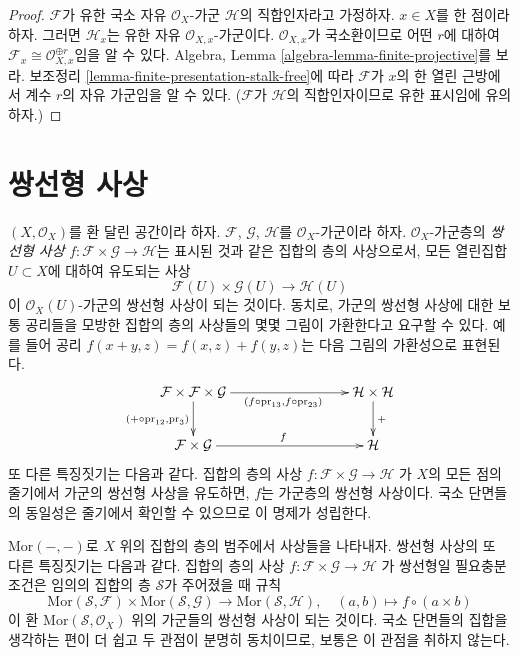 \begin{proof}
$\mathcal{F}$가 유한 국소 자유 $\mathcal{O}_X$-가군 $\mathcal{H}$의
직합인자라고 가정하자. $x \in X$를 한 점이라 하자. 그러면
$\mathcal{H}_x$는 유한 자유 $\mathcal{O}_{X, x}$-가군이다.
$\mathcal{O}_{X, x}$가 국소환이므로 어떤 $r$에 대하여
$\mathcal{F}_x \cong \mathcal{O}_{X, x}^{\oplus r}$임을 알 수 있다.
Algebra, Lemma \ref{algebra-lemma-finite-projective}를 보라.
보조정리 \ref{lemma-finite-presentation-stalk-free}에 따라
$\mathcal{F}$가 $x$의 한 열린 근방에서 계수 $r$의 자유 가군임을 알 수 있다.
($\mathcal{F}$가 $\mathcal{H}$의 직합인자이므로 유한 표시임에 유의하자.)
\end{proof}





\section{쌍선형 사상}
\label{section-bilinear}


\noindent
$(X, \mathcal{O}_X)$를 환 달린 공간이라 하자.
$\mathcal{F}$, $\mathcal{G}$, $\mathcal{H}$를 $\mathcal{O}_X$-가군이라 하자.
$\mathcal{O}_X$-가군층의 {\it 쌍선형 사상}
$f : \mathcal{F} \times \mathcal{G} \to \mathcal{H}$는 표시된 것과 같은
집합의 층의 사상으로서, 모든 열린집합 $U \subset X$에 대하여 유도되는 사상
$$
\mathcal{F}(U) \times \mathcal{G}(U) \to \mathcal{H}(U)
$$
이 $\mathcal{O}_X(U)$-가군의 쌍선형 사상이 되는 것이다. 동치로,
가군의 쌍선형 사상에 대한 보통 공리들을 모방한 집합의 층의 사상들의
몇몇 그림이 가환한다고 요구할 수 있다. 예를 들어 공리
$f(x + y, z) = f(x, z) + f(y, z)$는 다음 그림의 가환성으로 표현된다.
$$
\xymatrix{
\mathcal{F} \times \mathcal{F} \times \mathcal{G}
\ar[rrr]_{(f \circ \text{pr}_{13}, f \circ \text{pr}_{23})}
\ar[d]_{(+ \circ \text{pr}_{12}, \text{pr}_3)} & & &
\mathcal{H} \times \mathcal{H}
\ar[d]^{+} \\
\mathcal{F} \times \mathcal{G} \ar[rrr]^f & & &
\mathcal{H}
}
$$
또 다른 특징짓기는 다음과 같다. 집합의 층의 사상
$f : \mathcal{F} \times \mathcal{G} \to \mathcal{H}$
가 $X$의 모든 점의 줄기에서 가군의 쌍선형 사상을 유도하면,
$f$는 가군층의 쌍선형 사상이다. 국소 단면들의 동일성은 줄기에서
확인할 수 있으므로 이 명제가 성립한다.

\medskip\noindent
$\text{Mor}( - , - )$로 $X$ 위의 집합의 층의 범주에서 사상들을 나타내자.
쌍선형 사상의 또 다른 특징짓기는 다음과 같다. 집합의 층의 사상
$f : \mathcal{F} \times \mathcal{G} \to \mathcal{H}$
가 쌍선형일 필요충분조건은 임의의 집합의 층 $\mathcal{S}$가 주어졌을 때 규칙
$$
\text{Mor}(\mathcal{S}, \mathcal{F}) \times
\text{Mor}(\mathcal{S}, \mathcal{G}) \to
\text{Mor}(\mathcal{S}, \mathcal{H}),\quad
(a, b) \mapsto f \circ (a \times b)
$$
이 환 $\text{Mor}(\mathcal{S}, \mathcal{O}_X)$ 위의 가군들의
쌍선형 사상이 되는 것이다. 국소 단면들의 집합을 생각하는 편이 더 쉽고
두 관점이 분명히 동치이므로, 보통은 이 관점을 취하지 않는다.

